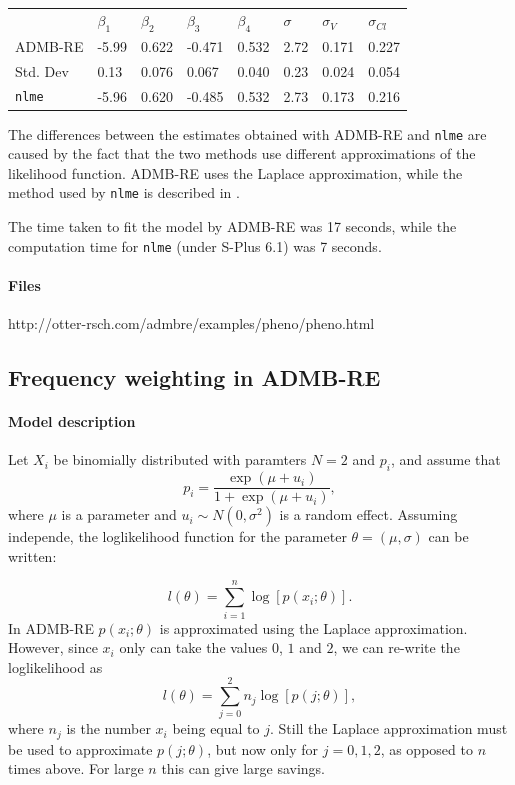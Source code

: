 \documentclass[12pt,letter,reqno]{book}
\begin{document}
\begin{center}
\begin{tabular}{llllllll}
& $\beta_{1}$ & $\beta_{2}$ & $\beta_{3}$ & $\beta_{4}$ & $\sigma $ & $%
\sigma_{V}$ & $\sigma_{Cl}$ \\ 
ADMB-RE & -5.99 & 0.622 & -0.471 & 0.532 & 2.72 & 0.171 & 0.227 \\ 
Std. Dev & 0.13 & 0.076 & 0.067 & 0.040 & 0.23 & 0.024 & 0.054 \\ 
\texttt{nlme} & -5.96 & 0.620 & -0.485 & 0.532 & 2.73 & 0.173 & 0.216%
\end{tabular}
\end{center}
The differences between the estimates obtained with ADMB-RE and \texttt{nlme}
are caused by the fact that the two methods use different approximations of
the likelihood function. ADMB-RE uses the Laplace approximation, while the
method used by \texttt{nlme} is described in %
.

The time taken to fit the model by ADMB-RE was 17 seconds, while the
computation time for \texttt{nlme} (under S-Plus 6.1) was 7 seconds.

\paragraph{Files} http://otter-rsch.com/admbre/examples/pheno/pheno.html

\newpage

\subsection{Frequency weighting in ADMB-RE}
\label{seq:frequency_example}

\paragraph{Model description}
Let $X_{i}$ be binomially distributed with paramters $N=2$ and $p_{i}$, and
assume that%
\begin{equation}
p_{i}=\frac{\exp (\mu +u_{i})}{1+\exp (\mu +u_{i})},
\end{equation}%
where $\mu $ is a parameter and $u_{i}\sim N(0,\sigma ^{2})$ is a random
effect. Assuming independe, the loglikelihood function for the parameter $%
\theta =(\mu ,\sigma )$ can be written:

\begin{equation}
l(\theta )=\sum_{i=1}^{n}\log \left[ p(x_{i};\theta )\right] .
\end{equation}%
In ADMB-RE $p(x_{i};\theta )$ is approximated using the Laplace
approximation. However, since $x_{i}$ only can take the values $0$, $1$ and $%
2$, we can re-write the loglikelihood as 
\begin{equation}
l(\theta )=\sum_{j=0}^{2}n_{j}\log \left[ p(j;\theta )\right] ,  \label{l_w}
\end{equation}%
where $n_{j}$ is the number $x_{i}$ being equal to $j$. Still the Laplace
approximation must be used to approximate $p(j;\theta )$, but now only for $%
j=0,1,2$, as opposed to $n$ times above. For large $n$ this can give large
savings.
\end{document}
